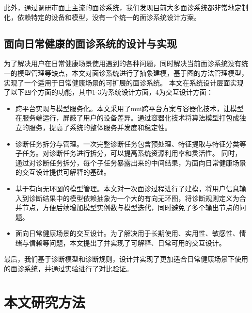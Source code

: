 此外，通过调研市面上主流的面诊系统，我们发现目前大多面诊系统都非常地定制化，依赖特定的设备和模型，没有一个统一的面诊系统设计方案。


\subsection{面向日常健康的面诊系统的设计与实现}

为了解决用户在日常健康场景使用遇到的各种问题，同时解决当前面诊系统没有统一的模型管理等缺点，本文对面诊系统进行了抽象建模，基于图的方法管理模型，实现了一个适用于日常健康场景的可扩展的面诊系统。
本文在系统设计层面实现了以下四个方面的功能，其中1-3为系统设计方面，4为交互设计方面：

\begin{itemize}

    \item 跨平台实现与模型服务化。本文采用了mui跨平台方案与容器化技术，让模型在服务端运行，屏蔽了用户的设备差异。通过容器化技术将算法模型打包成独立的服务，提高了系统的整体服务并发度和稳定性。

    \item 诊断任务拆分与管理。一次完整诊断任务包含预处理、特征提取与特征分类等子任务。对诊断任务进行拆分，可以提高系统资源利用率和灵活性。
    同时，通过对诊断任务拆分，每个子任务暴露出来的中间结果，为面向日常健康场景的交互设计提供可解释的基础。
    
    \item 基于有向无环图的模型管理。本文对一次面诊过程进行了建模，将用户信息输入到诊断结果中的模型依赖抽象为一个大的有向无环图，将诊断规则定义为合并节点，方便后续增加模型实例数与模型迭代，同时避免了多个输出节点的问题。
    
    \item 面向日常健康场景的交互设计。为了解决用于长期使用、实用性、敏感性、情绪与信赖等问题，本文提出了并实现了可解释、日常可用的交互设计。

\end{itemize}

最后，我们基于诊断模型和诊断规则，设计并实现了更加适合日常健康场景下使用的面诊系统，并通过实验进行了对比验证。

\section{本文研究方法}

